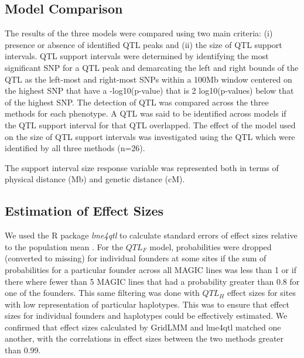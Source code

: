 \documentclass[article,9pt,twocolumn,twoside]{rilabRxiv}
\newcommand{\jri}[1]{{\small \textcolor{red}{#1}}}
\begin{document}
\subsection{Model Comparison}
The results of the three models were compared using two main criteria: (i) presence or absence of identified QTL peaks and (ii) the size of QTL support intervals.
QTL support intervals were determined by identifying the most significant SNP for a QTL peak and demarcating the left and right bounds of the QTL as the left-most and right-most SNPs within a 100Mb window centered on the highest SNP that have a -log10(p-value) that is 2 log10(p-values) below that of the highest SNP.
The detection of QTL was compared across the three methods for each phenotype.
A QTL was said to be identified across models if the QTL support interval for that QTL overlapped.
The effect of the model used on the size of QTL support intervals was investigated using the QTL which were identified by all three methods (n=26).  %

The support interval size response variable was represented both in terms of physical distance (Mb) and genetic distance (cM).

\subsection{Estimation of Effect Sizes}
We used the R package \emph{lme4qtl} to calculate standard errors of effect sizes relative to the population mean \citep{Ziyatdinov}.
For the $QTL_F$ model, probabilities were dropped (converted to missing) for individual founders at some sites if the sum of probabilities for a particular founder across all MAGIC lines was less than 1 or if there where fewer than 5 MAGIC lines that had a probability greater than 0.8 for one of the founders.
This same filtering was done with $QTL_H$ effect sizes for sites with low representation of particular haplotypes.
This was to ensure that effect sizes for individual founders and haplotypes could be effectively estimated.
We confirmed that effect sizes calculated by GridLMM and lme4qtl matched one another, with the correlations in effect sizes between the two methods greater than 0.99.
\end{document}
